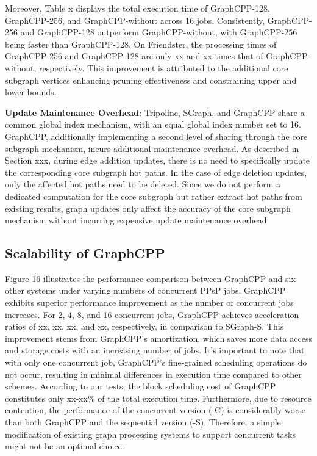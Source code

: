 \documentclass[lettersize,journal]{IEEEtran} %
\begin{document}
Moreover, Table x displays the total execution time of GraphCPP-128, GraphCPP-256, and GraphCPP-without across 16 jobs. Consistently, GraphCPP-256 and GraphCPP-128 outperform GraphCPP-without, with GraphCPP-256 being faster than GraphCPP-128. On Friendster, the processing times of GraphCPP-256 and GraphCPP-128 are only xx and xx times that of GraphCPP-without, respectively. This improvement is attributed to the additional core subgraph vertices enhancing pruning effectiveness and constraining upper and lower bounds.

{\bf{Update Maintenance Overhead}}: Tripoline, SGraph, and GraphCPP share a common global index mechanism, with an equal global index number set to 16. GraphCPP, additionally implementing a second level of sharing through the core subgraph mechanism, incurs additional maintenance overhead. As described in Section xxx, during edge addition updates, there is no need to specifically update the corresponding core subgraph hot paths. In the case of edge deletion updates, only the affected hot paths need to be deleted. Since we do not perform a dedicated computation for the core subgraph but rather extract hot paths from existing results, graph updates only affect the accuracy of the core subgraph mechanism without incurring expensive update maintenance overhead.


\subsection{Scalability of GraphCPP}
Figure 16 illustrates the performance comparison between GraphCPP and six other systems under varying numbers of concurrent PPsP jobs. GraphCPP exhibits superior performance improvement as the number of concurrent jobs increases. For 2, 4, 8, and 16 concurrent jobs, GraphCPP achieves acceleration ratios of xx, xx, xx, and xx, respectively, in comparison to SGraph-S. This improvement stems from GraphCPP's amortization, which saves more data access and storage costs with an increasing number of jobs. It's important to note that with only one concurrent job, GraphCPP's fine-grained scheduling operations do not occur, resulting in minimal differences in execution time compared to other schemes. According to our tests, the block scheduling cost of GraphCPP constitutes only xx-xx\% of the total execution time. Furthermore, due to resource contention, the performance of the concurrent version (-C) is considerably worse than both GraphCPP and the sequential version (-S). Therefore, a simple modification of existing graph processing systems to support concurrent tasks might not be an optimal choice.
\end{document}
